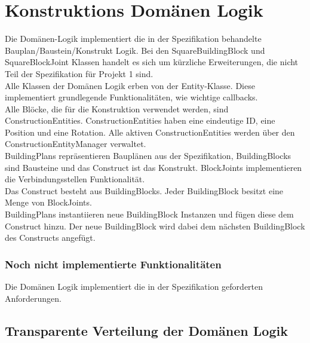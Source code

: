 \section{Konstruktions Domänen Logik}


Die Domänen-Logik implementiert die in der Spezifikation behandelte Bauplan/Baustein/Konstrukt Logik. Bei den SquareBuildingBlock und SquareBlockJoint Klassen handelt es sich um kürzliche Erweiterungen, die nicht Teil der Spezifikation für Projekt 1 sind.\\

Alle Klassen der Domänen Logik erben von der Entity-Klasse. Diese implementiert grundlegende Funktionalitäten, wie wichtige callbacks.\\
Alle Blöcke, die für die Konstruktion verwendet werden, sind ConstructionEntities. ConstructionEntities haben eine eindeutige ID, eine Position und eine Rotation. Alle aktiven ConstructionEntities werden über den ConstructionEntityManager verwaltet.\\
BuildingPlans repräsentieren Bauplänen aus der Spezifikation, BuildingBlocks sind Bausteine und das Construct ist das Konstrukt. BlockJoints implementieren die Verbindungsstellen Funktionalität.\\
Das Construct besteht aus BuildingBlocks. Jeder BuildingBlock besitzt eine Menge von BlockJoints.\\
BuildingPlans instantiieren neue BuildingBlock Instanzen und fügen diese dem Construct hinzu. Der neue BuildingBlock wird dabei dem nächsten BuildingBlock des Constructs angefügt.  

\subsubsection{Noch nicht implementierte Funktionalitäten}

Die Domänen Logik implementiert die in der Spezifikation geforderten Anforderungen.

\subsection{Transparente Verteilung der Domänen Logik}

